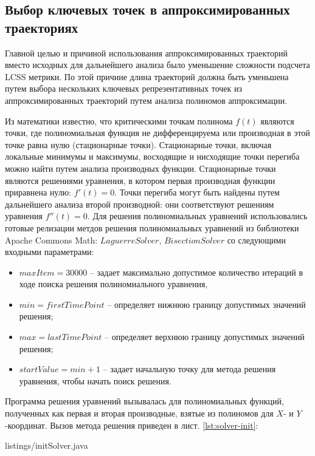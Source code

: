 \subsection{Выбор ключевых точек в аппроксимированных траекториях}

Главной целью и причиной использования аппроксимированных траекторий вместо исходных для дальнейшего анализа было уменьшение сложности подсчета LCSS метрики. По этой причине длина траекторий должна быть уменьшена путем выбора нескольких ключевых репрезентативных точек из аппроксимированных траекторий путем анализа полиномов аппроксимации.

Из математики известно, что критическими точкам полинома $f(t)$ являются точки, где полиномиальная функция не дифференцируема или производная в этой точке равна нулю (стационарные точки). Стационарные точки, включая локальные минимумы и максимумы, восходящие и нисходящие точки перегиба можно найти путем анализа производных функции. Стационарные точки являются решениями уравнения, в котором первая производная функции приравнена нулю: $f'(t) = 0$. Точки перегиба могут быть найдены путем дальнейшего анализа второй производной: они соответствуют решениям уравнения $f''(t) = 0$. Для решения полиномиальных уравнений использовались готовые релизации метдов решения полиномиальных уравнений из библиотеки Apache Commons Math: $LaguerreSolver$, $BisectionSolver$ со следующими входными параметрами:

\begin{itemize}
	\item $maxItem = 30000$ -- задает максимально допустимое количество итераций в ходе поиска решения полиномиального уравнения,
	\item $min = firstTimePoint$ -- определяет нижнюю границу допустимых значений решения;
	\item $max = lastTimePoint$ -- определяет верхнюю границу допустимых значений решения;
	\item $startValue = min + 1$ -- задает начальную точку для метода решения уравнения, чтобы начать поиск решения.
\end{itemize}

Программа решения уравнений вызывалась для полиномиальных функций, полученных как первая и вторая производные, взятые из полиномов для $X$- и $Y$-координат. Вызов метода решения приведен в лист. \ref{lst:solver-init}:

 {listings/initSolver.java}

